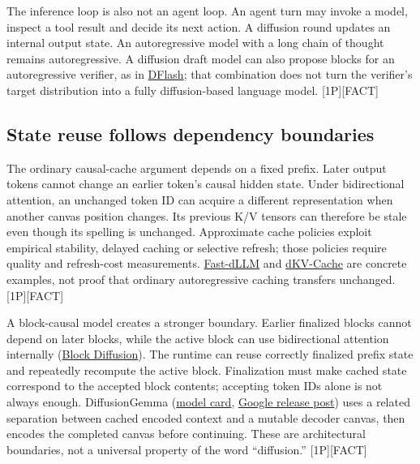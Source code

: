 The inference loop is also not an agent loop. An agent turn may invoke a
model, inspect a tool result and decide its next action. A diffusion
round updates an internal output state. An autoregressive model with a
long chain of thought remains autoregressive. A diffusion draft model
can also propose blocks for an autoregressive verifier, as in
\href{https://arxiv.org/abs/2602.06036}{DFlash}; that combination does
not turn the verifier's target distribution into a fully diffusion-based
language model. \mbox{{[}1P{]}}\hspace{0pt}\mbox{{[}FACT{]}}

\subsection{State reuse follows dependency
boundaries}\label{state-reuse-follows-dependency-boundaries}

The ordinary causal-cache argument depends on a fixed prefix. Later
output tokens cannot change an earlier token's causal hidden state.
Under bidirectional attention, an unchanged token ID can acquire a
different representation when another canvas position changes. Its
previous K/V tensors can therefore be stale even though its spelling is
unchanged. Approximate cache policies exploit empirical stability,
delayed caching or selective refresh; those policies require quality and
refresh-cost measurements.
\href{https://arxiv.org/abs/2505.22618}{Fast-dLLM} and
\href{https://arxiv.org/abs/2505.15781}{dKV-Cache} are concrete
examples, not proof that ordinary autoregressive caching transfers
unchanged. \mbox{{[}1P{]}}\hspace{0pt}\mbox{{[}FACT{]}}

A block-causal model creates a stronger boundary. Earlier finalized
blocks cannot depend on later blocks, while the active block can use
bidirectional attention internally
(\href{https://arxiv.org/abs/2503.09573}{Block Diffusion}). The runtime
can reuse correctly finalized prefix state and repeatedly recompute the
active block. Finalization must make cached state correspond to the
accepted block contents; accepting token IDs alone is not always enough.
DiffusionGemma
(\href{https://huggingface.co/google/diffusiongemma-26B-A4B-it}{model
card},
\href{https://blog.google/innovation-and-ai/technology/developers-tools/diffusion-gemma-faster-text-generation/}{Google
release post}) uses a related separation between cached encoded context
and a mutable decoder canvas, then encodes the completed canvas before
continuing. These are architectural boundaries, not a universal property
of the word ``diffusion.'' \mbox{{[}1P{]}}\hspace{0pt}\mbox{{[}FACT{]}}

